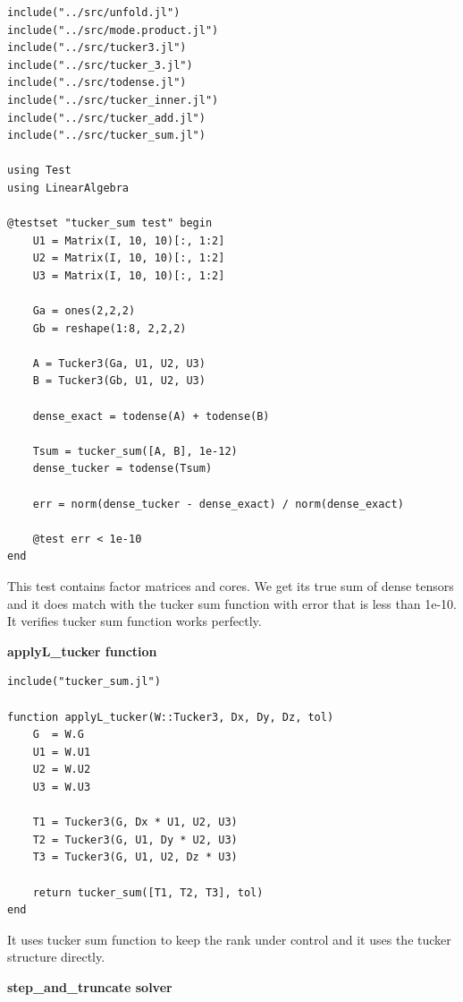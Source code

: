 \documentclass[11pt]{report}
\begin{document}
\begin{lstlisting}
include("../src/unfold.jl")
include("../src/mode.product.jl")
include("../src/tucker3.jl")
include("../src/tucker_3.jl")
include("../src/todense.jl")
include("../src/tucker_inner.jl")
include("../src/tucker_add.jl")
include("../src/tucker_sum.jl")

using Test
using LinearAlgebra

@testset "tucker_sum test" begin
    U1 = Matrix(I, 10, 10)[:, 1:2]
    U2 = Matrix(I, 10, 10)[:, 1:2]
    U3 = Matrix(I, 10, 10)[:, 1:2]

    Ga = ones(2,2,2)           
    Gb = reshape(1:8, 2,2,2)      

    A = Tucker3(Ga, U1, U2, U3)
    B = Tucker3(Gb, U1, U2, U3)

    dense_exact = todense(A) + todense(B)

    Tsum = tucker_sum([A, B], 1e-12)
    dense_tucker = todense(Tsum)

    err = norm(dense_tucker - dense_exact) / norm(dense_exact)

    @test err < 1e-10
end
\end{lstlisting}

This test contains factor matrices and cores. We get its true sum of dense tensors and it does match with the tucker sum function with error that is less than 1e-10.
It verifies tucker sum function works perfectly.

\textbf{applyL\_tucker function}

\begin{lstlisting}
include("tucker_sum.jl")

function applyL_tucker(W::Tucker3, Dx, Dy, Dz, tol)
    G  = W.G
    U1 = W.U1
    U2 = W.U2
    U3 = W.U3

    T1 = Tucker3(G, Dx * U1, U2, U3)
    T2 = Tucker3(G, U1, Dy * U2, U3)
    T3 = Tucker3(G, U1, U2, Dz * U3)

    return tucker_sum([T1, T2, T3], tol)
end

\end{lstlisting}
It uses tucker sum function to keep the rank under control and it uses the tucker structure directly.

\textbf{step\_and\_truncate solver}
\end{document}
